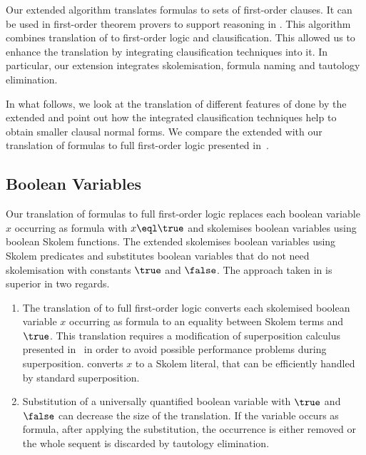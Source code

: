 
Our extended \newcnf{} algorithm translates \folb{} formulas to sets of first-order clauses. It can be used in first-order theorem provers to support reasoning in \folb{}. This algorithm combines translation of \folb{} to first-order logic and clausification. This allowed us to enhance the translation by integrating clausification techniques into it. In particular, our extension integrates skolemisation, formula naming and tautology elimination. 

In what follows, we look at the translation of different features of \folb{} done by the extended \newcnf{} and point out how the integrated clausification techniques help to obtain smaller clausal normal forms. We compare the extended \newcnf{} with our translation of \folb{} formulas to full first-order logic presented in~\cite{FOOL}.


\subsection{Boolean Variables}
Our translation of \folb{} formulas to full first-order logic replaces each boolean variable $x$ occurring as formula with $x \eql \true$ and skolemises boolean variables using boolean Skolem functions. The extended \newcnf{} skolemises boolean variables using Skolem predicates and substitutes boolean variables that do not need skolemisation with constants $\true$ and $\false$. The approach taken in \newcnf{} is superior in two regards.
\begin{enumerate}
  \item The translation of \folb{} to full first-order logic converts each skolemised boolean variable $x$ occurring as formula to an equality between Skolem terms and $\true$. This translation requires a modification of superposition calculus presented in~\cite{FOOL} in order to avoid possible performance problems during superposition. \newcnf{} converts $x$ to a Skolem literal, that can be efficiently handled by standard superposition.  
  \item Substitution of a universally quantified boolean variable with $\true$ and $\false$ can decrease the size of the translation. If the variable occurs as formula, after applying the substitution, the occurrence is either removed or the whole sequent is discarded by tautology elimination.
\end{enumerate}

